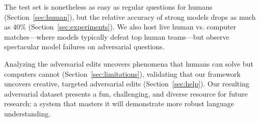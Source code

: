 The \challenge{} test set is nonetheless as easy as
regular questions for humans (Section~\ref{sec:human}), but
the relative accuracy of strong  models drops as much as 40\%
(Section~\ref{sec:experiments}).
We also host live human vs. computer matches---where models typically defeat
top human teams---but observe spectacular model failures
on adversarial questions.

Analyzing the adversarial edits uncovers phenomena
that humans can solve but computers cannot
(Section~\ref{sec:limitations}), validating that our framework
uncovers creative, targeted adversarial edits (Section~\ref{sec:help}).
Our resulting adversarial dataset presents a fun, challenging,
and diverse resource for future  research: a system that masters
it will demonstrate more robust language understanding.